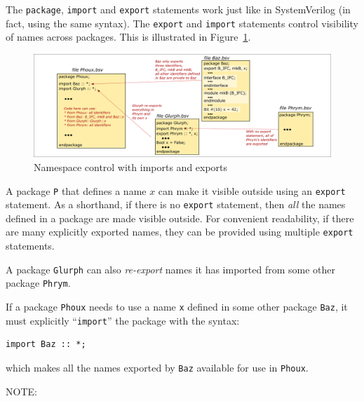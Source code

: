 The \verb|package|, \verb|import| and \verb|export| statements work
just like in SystemVerilog (in fact, using the same syntax).  The
\verb|export| and \verb|import| statements control visibility of names
across packages.  This is illustrated in Figure~\ref{Fig_BSV_namespace_control}.
\begin{figure}[htbp]
  \centerline{\includegraphics[width=6in,angle=0]{Figures/Fig_BSV_namespace_control}}
  \caption{\label{Fig_BSV_namespace_control}
           Namespace control with imports and exports}
\end{figure}


A package \verb|P| that defines a name $x$ can make it visible outside
using an \verb|export| statement.  As a shorthand, if there is no
\verb|export| statement, then \emph{all} the names defined in a
package are made visible outside.  For convenient readability, if
there are many explicitly exported names, they can be provided using
multiple \verb|export| statements.

A package \verb|Glurph| can also \emph{re-export} names it has
imported from some other package \verb|Phrym|.

If a package \verb|Phoux| needs to use a name \verb|x| defined in some
other package \verb|Baz|, it must explicitly ``\verb|import|'' the
package with the syntax:

{\footnotesize
\begin{Verbatim}[frame=single]
import Baz :: *;
\end{Verbatim}
}

which makes all the names exported by \verb|Baz| available for use in
\verb|Phoux|.

\vspace{2ex}

NOTE: 

